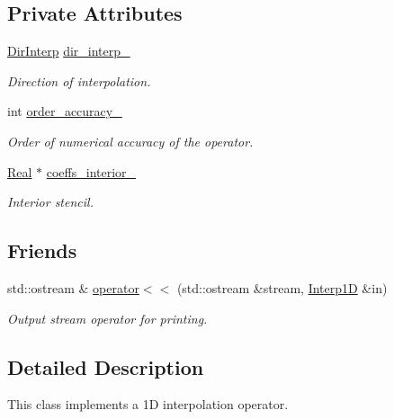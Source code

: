\subsection*{Private Attributes}
\begin{DoxyCompactItemize}
\item 
\hyperlink{group__c02-enums_ga674ec67bd1baa04e5dc06c2bcc351972}{Dir\-Interp} \hyperlink{classmtk_1_1Interp1D_a854e2c72f07c9fca4bbe32bfad2e0792}{dir\-\_\-interp\-\_\-}
\begin{DoxyCompactList}\small\item\em Direction of interpolation. \end{DoxyCompactList}\item 
int \hyperlink{classmtk_1_1Interp1D_a1ee8467d93536dc04240cd76f0d95c9c}{order\-\_\-accuracy\-\_\-}
\begin{DoxyCompactList}\small\item\em Order of numerical accuracy of the operator. \end{DoxyCompactList}\item 
\hyperlink{group__c01-roots_gac080bbbf5cbb5502c9f00405f894857d}{Real} $\ast$ \hyperlink{classmtk_1_1Interp1D_abae01ab84103d8b11903357cfdeb94d5}{coeffs\-\_\-interior\-\_\-}
\begin{DoxyCompactList}\small\item\em Interior stencil. \end{DoxyCompactList}\end{DoxyCompactItemize}
\subsection*{Friends}
\begin{DoxyCompactItemize}
\item 
std\-::ostream \& \hyperlink{classmtk_1_1Interp1D_a6e54e703f239df8e5db192638ac86686}{operator$<$$<$} (std\-::ostream \&stream, \hyperlink{classmtk_1_1Interp1D}{Interp1\-D} \&in)
\begin{DoxyCompactList}\small\item\em Output stream operator for printing. \end{DoxyCompactList}\end{DoxyCompactItemize}


\subsection{Detailed Description}
This class implements a 1\-D interpolation operator. 

